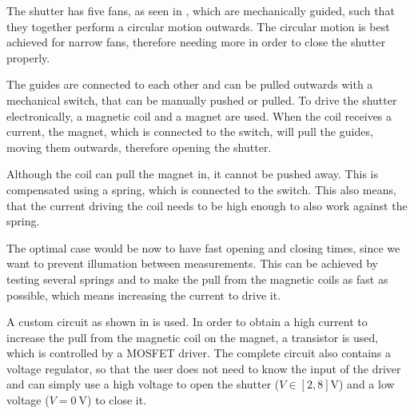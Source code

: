 The shutter has five fans, as seen in , which are mechanically guided, such that they together perform a circular motion outwards. The circular motion is best achieved for narrow fans, therefore needing more in order to close the shutter properly.

The guides are connected to each other and can be pulled outwards with a mechanical switch, that can be manually pushed or pulled. To drive the shutter electronically, a magnetic coil and a magnet are used. When the coil receives a current, the magnet, which is connected to the switch, will pull the guides, moving them outwards, therefore opening the shutter.

Although the coil can pull the magnet in, it cannot be pushed away. This is compensated using a spring, which is connected to the switch. This also means, that the current driving the coil needs to be high enough to also work against the spring.

The optimal case would be now to have fast opening and closing times, since we want to prevent illumation between measurements. This can be achieved by testing several springs and to make the pull from the magnetic coils as fast as possible, which means increasing the current to drive it.

A custom circuit as shown in  is used. In order to obtain a high current to increase the pull from the magnetic coil on the magnet, a transistor is used, which is controlled by a MOSFET driver. The complete circuit also contains a voltage regulator, so that the user does not need to know the input of the driver and can simply use a high voltage to open the shutter ($V\in\left[2,8\right]\mathrm{V}$) and a low voltage ($V=\SI{0}{\volt}$) to close it.


